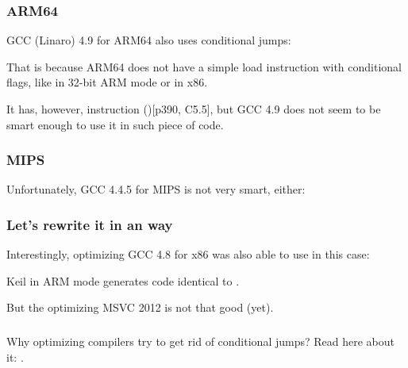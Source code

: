 

\subsubsection{ARM64}

\Optimizing GCC (Linaro) 4.9 for ARM64 also uses conditional jumps:



That is because ARM64 does not have a simple load instruction with conditional flags,
like  in 32-bit ARM mode or  in x86.

It has, however,  instruction ()[\ARMSixFourRef p390, C5.5],
but GCC 4.9 does not seem to be smart enough to use it in such piece of code.

\subsubsection{MIPS}

Unfortunately, GCC 4.4.5 for MIPS is not very smart, either:



\subsubsection{Let's rewrite it in an  way}




Interestingly, optimizing GCC 4.8 for x86 was also able to use  in this case:



\Optimizing Keil in ARM mode generates code identical to .

But the optimizing MSVC 2012 is not that good (yet).

\subsubsection{\Conclusion{}}

Why optimizing compilers try to get rid of conditional jumps? Read here about it: .
